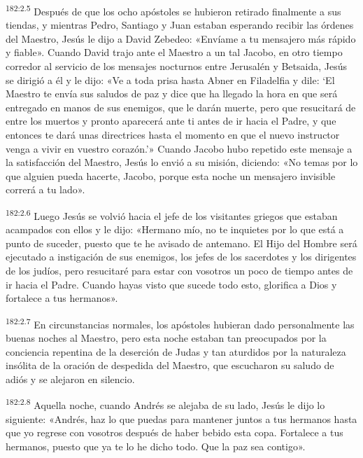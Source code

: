 \par 
\textsuperscript{182:2.5} Después de que los ocho apóstoles se hubieron retirado finalmente a sus tiendas, y mientras Pedro, Santiago y Juan estaban esperando recibir las órdenes del Maestro, Jesús le dijo a David Zebedeo: «Envíame a tu mensajero más rápido y fiable». Cuando David trajo ante el Maestro a un tal Jacobo, en otro tiempo corredor al servicio de los mensajes nocturnos entre Jerusalén y Betsaida, Jesús se dirigió a él y le dijo: «Ve a toda prisa hasta Abner en Filadelfia y dile: `El Maestro te envía sus saludos de paz y dice que ha llegado la hora en que será entregado en manos de sus enemigos, que le darán muerte, pero que resucitará de entre los muertos y pronto aparecerá ante ti antes de ir hacia el Padre, y que entonces te dará unas directrices hasta el momento en que el nuevo instructor venga a vivir en vuestro corazón.'» Cuando Jacobo hubo repetido este mensaje a la satisfacción del Maestro, Jesús lo envió a su misión, diciendo: «No temas por lo que alguien pueda hacerte, Jacobo, porque esta noche un mensajero invisible correrá a tu lado».

\par 
\textsuperscript{182:2.6} Luego Jesús se volvió hacia el jefe de los visitantes griegos que estaban acampados con ellos y le dijo: «Hermano mío, no te inquietes por lo que está a punto de suceder, puesto que te he avisado de antemano. El Hijo del Hombre será ejecutado a instigación de sus enemigos, los jefes de los sacerdotes y los dirigentes de los judíos, pero resucitaré para estar con vosotros un poco de tiempo antes de ir hacia el Padre. Cuando hayas visto que sucede todo esto, glorifica a Dios y fortalece a tus hermanos».

\par 
\textsuperscript{182:2.7} En circunstancias normales, los apóstoles hubieran dado personalmente las buenas noches al Maestro, pero esta noche estaban tan preocupados por la conciencia repentina de la deserción de Judas y tan aturdidos por la naturaleza insólita de la oración de despedida del Maestro, que escucharon su saludo de adiós y se alejaron en silencio.

\par 
\textsuperscript{182:2.8} Aquella noche, cuando Andrés se alejaba de su lado, Jesús le dijo lo siguiente: «Andrés, haz lo que puedas para mantener juntos a tus hermanos hasta que yo regrese con vosotros después de haber bebido esta copa. Fortalece a tus hermanos, puesto que ya te lo he dicho todo. Que la paz sea contigo».

